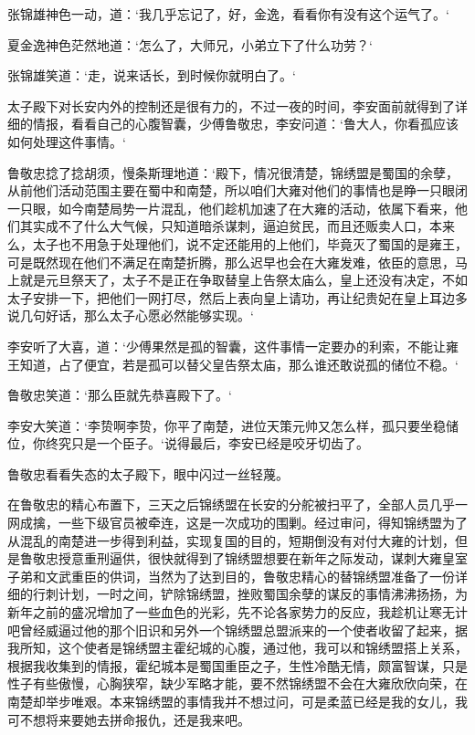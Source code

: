张锦雄神色一动，道：‘我几乎忘记了，好，金逸，看看你有没有这个运气了。‘

夏金逸神色茫然地道：‘怎么了，大师兄，小弟立下了什么功劳？‘

张锦雄笑道：‘走，说来话长，到时候你就明白了。‘

太子殿下对长安内外的控制还是很有力的，不过一夜的时间，李安面前就得到了详细的情报，看看自己的心腹智囊，少傅鲁敬忠，李安问道：‘鲁大人，你看孤应该如何处理这件事情。‘

鲁敬忠捻了捻胡须，慢条斯理地道：‘殿下，情况很清楚，锦绣盟是蜀国的余孽，从前他们活动范围主要在蜀中和南楚，所以咱们大雍对他们的事情也是睁一只眼闭一只眼，如今南楚局势一片混乱，他们趁机加速了在大雍的活动，依属下看来，他们其实成不了什么大气候，只知道暗杀谋刺，逼迫贫民，而且还贩卖人口，本来么，太子也不用急于处理他们，说不定还能用的上他们，毕竟灭了蜀国的是雍王，可是既然现在他们不满足在南楚折腾，那么迟早也会在大雍发难，依臣的意思，马上就是元旦祭天了，太子不是正在争取替皇上告祭太庙么，皇上还没有决定，不如太子安排一下，把他们一网打尽，然后上表向皇上请功，再让纪贵妃在皇上耳边多说几句好话，那么太子心愿必然能够实现。‘

李安听了大喜，道：‘少傅果然是孤的智囊，这件事情一定要办的利索，不能让雍王知道，占了便宜，若是孤可以替父皇告祭太庙，那么谁还敢说孤的储位不稳。‘

鲁敬忠笑道：‘那么臣就先恭喜殿下了。‘

李安大笑道：‘李贽啊李贽，你平了南楚，进位天策元帅又怎么样，孤只要坐稳储位，你终究只是一个臣子。‘说得最后，李安已经是咬牙切齿了。

鲁敬忠看看失态的太子殿下，眼中闪过一丝轻蔑。

在鲁敬忠的精心布置下，三天之后锦绣盟在长安的分舵被扫平了，全部人员几乎一网成擒，一些下级官员被牵连，这是一次成功的围剿。经过审问，得知锦绣盟为了从混乱的南楚进一步得到利益，实现复国的目的，短期倒没有对付大雍的计划，但是鲁敬忠授意重刑逼供，很快就得到了锦绣盟想要在新年之际发动，谋刺大雍皇室子弟和文武重臣的供词，当然为了达到目的，鲁敬忠精心的替锦绣盟准备了一份详细的行刺计划，一时之间，铲除锦绣盟，挫败蜀国余孽的谋反的事情沸沸扬扬，为新年之前的盛况增加了一些血色的光彩，先不论各家势力的反应，我趁机让寒无计吧曾经威逼过他的那个旧识和另外一个锦绣盟总盟派来的一个使者收留了起来，据我所知，这个使者是锦绣盟主霍纪城的心腹，通过他，我可以和锦绣盟搭上关系，根据我收集到的情报，霍纪城本是蜀国重臣之子，生性冷酷无情，颇富智谋，只是性子有些傲慢，心胸狭窄，缺少军略才能，要不然锦绣盟不会在大雍欣欣向荣，在南楚却举步唯艰。本来锦绣盟的事情我并不想过问，可是柔蓝已经是我的女儿，我可不想将来要她去拼命报仇，还是我来吧。

